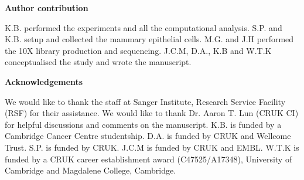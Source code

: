 \documentclass[titlepage, 12pt, oneside]{amsart}
\begin{document}
\textbf{Author contribution}

K.B. performed the experiments and all the computational analysis.
S.P. and K.B. setup and collected the mammary epithelial cells.
M.G. and J.H performed the 10X library production and sequencing.
J.C.M, D.A., K.B and W.T.K conceptualised the study and wrote the manuscript.

\textbf{Acknowledgements}

We would like to thank the staff at Sanger Institute, Research Service Facility (RSF) for their assistance.
We would like to thank Dr. Aaron T. Lun (CRUK CI) for helpful discussions and comments on the manuscript.
K.B. is funded by a Cambridge Cancer Centre studentship.
D.A. is funded by CRUK and Wellcome Trust.
S.P. is funded by CRUK.
J.C.M is funded by CRUK and EMBL.
W.T.K is funded by a CRUK career establishment award (C47525/A17348), University of Cambridge and Magdalene College, Cambridge.

\printbibliography
\end{document}
